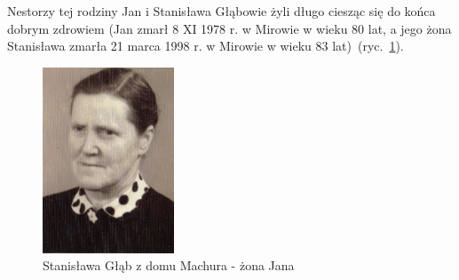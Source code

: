 Nestorzy tej rodziny Jan i Stanisława Głąbowie żyli długo ciesząc się do końca dobrym zdrowiem (Jan zmarł 8 XI 1978 r. w Mirowie w wieku 80 lat, a jego żona Stanisława zmarła 21 marca 1998 r. w Mirowie w wieku 83 lat)~(ryc.~\ref{rys:stanislawa_glab}).

\begin{figure}[!h]
\begin{center}
\includegraphics[width=0.35\textwidth]{zdjecia/stanislawa_glab.jpg}
\caption[Stanisława Głąb]{Stanisława Głąb z domu Machura - żona Jana}
\label{rys:stanislawa_glab}
\end{center}
\end{figure}

